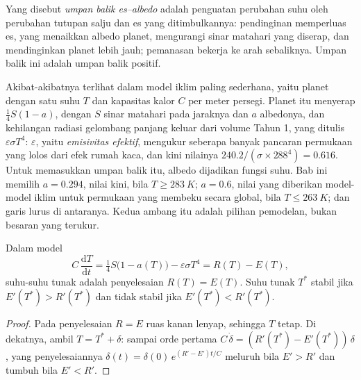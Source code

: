 \begin{definition}\label{def:b2:precambrian-earth:ice-albedo}
Yang disebut \emph{umpan balik es--albedo} adalah penguatan perubahan
suhu oleh perubahan tutupan salju dan es yang ditimbulkannya: pendinginan memperluas es, yang
menaikkan albedo planet, mengurangi sinar matahari yang diserap, dan mendinginkan planet lebih jauh;
pemanasan bekerja ke arah sebaliknya. Umpan balik ini adalah umpan balik positif.
\end{definition}

Akibat-akibatnya terlihat dalam model iklim paling sederhana, yaitu planet dengan satu suhu $T$ dan
kapasitas kalor $C$ per meter persegi. Planet itu menyerap $\tfrac14 S(1 - a)$, dengan $S$ sinar matahari
pada jaraknya dan $a$ albedonya, dan kehilangan radiasi gelombang panjang keluar dari volume
Tahun 1, yang ditulis $\varepsilon\sigma T^4$: $\varepsilon$, yaitu \emph{emisivitas efektif},
mengukur seberapa banyak pancaran permukaan yang lolos dari efek rumah kaca, dan kini nilainya
$240.2/(\sigma\times288^4) = 0.616$. Untuk memasukkan umpan balik itu, albedo dijadikan fungsi
suhu. Bab ini memilih $a = 0.294$, nilai kini, bila $T \ge \qty{283}{K}$; $a
= 0.6$, nilai yang diberikan model-model iklim untuk permukaan yang membeku secara global, bila $T \le \qty{263}{K}$; dan
garis lurus di antaranya. Kedua ambang itu adalah pilihan pemodelan, bukan besaran
yang terukur.

\begin{proposition}\label{prop:b2:precambrian-earth:ebm}
Dalam model
\[
  C\,\frac{\mathrm dT}{\mathrm dt} = \tfrac14 S\bigl(1 - a(T)\bigr) - \varepsilon\sigma T^4
  = R(T) - E(T),
\]
suhu-suhu tunak adalah penyelesaian $R(T) = E(T)$. Suhu tunak $T^*$
stabil jika $E'(T^*) > R'(T^*)$ dan tidak stabil jika $E'(T^*) < R'(T^*)$.
\end{proposition}

\begin{proof}
Pada penyelesaian $R = E$ ruas kanan lenyap, sehingga $T$ tetap. Di dekatnya, ambil $T = T^*
+ \delta$: sampai orde pertama $C\,\dot\delta = (R'(T^*) - E'(T^*))\,\delta$, yang penyelesaiannya
$\delta(t) = \delta(0)\,e^{(R' - E')t/C}$ meluruh bila $E' > R'$ dan tumbuh bila $E' < R'$.
\end{proof}

